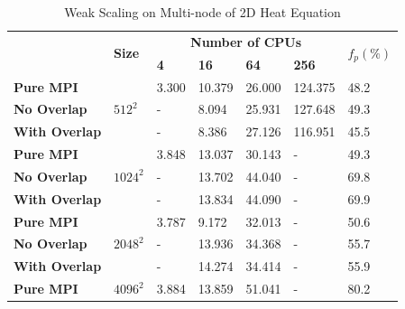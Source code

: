 \begin{table}
  \caption{Weak Scaling on Multi-node of 2D Heat Equation}
  \label{TAB:Benchmark:Weak_PURE_MPI_Multi_Node}
  \begin{minipage}{\columnwidth}
    \begin{center}
      \footnotesize %
      \begin{tabular}{>{\bfseries}p{3cm} p{1.5cm} p{1.5cm} p{1.5cm} p{1.5cm} p{1.5cm} p{1cm}}
        \toprule
        \multirow{2}{*}{Strategy}     & \multirow{2}{*}{\bfseries Size} & \multicolumn{4}{c}{\bfseries  Number of CPUs}   & \multirow{2}{*}{\bfseries $f_p(\%)$}  \\
                                      &                                 & \bfseries 4   & \bfseries 16   & \bfseries 64  & \bfseries 256  &                        \\
        \midrule
        Pure MPI      & \multirow{3}{*}{$512^2$}      & 3.300  & 10.379  & 26.000   & 124.375                                    & 48.2 \\
        No Overlap    &                               &   -    &  8.094  & 25.931   & 127.648                                    & 49.3 \\
        With Overlap  &                               &   -    &  8.386  & 27.126   & 116.951                                    & 45.5 \\
        \midrule
        Pure MPI      & \multirow{3}{*}{$1024^2$}     & 3.848  & 13.037  & 30.143   &   -                                        & 49.3 \\
        No Overlap    &                               &   -    & 13.702  & 44.040   &   -                                        & 69.8 \\
        With Overlap  &                               &   -    & 13.834  & 44.090   &   -                                        & 69.9 \\
        \midrule
        Pure MPI      & \multirow{3}{*}{$2048^2$}     & 3.787  & 9.172   & 32.013   &   -                                        & 50.6 \\
        No Overlap    &                               &   -    & 13.936  & 34.368   &   -                                        & 55.7 \\
        With Overlap  &                               &   -    & 14.274  & 34.414   &   -                                        & 55.9 \\
        \midrule
        Pure MPI      & \multirow{3}{*}{$4096^2$}     & 3.884  & 13.859  & 51.041   &   -                                        & 80.2 \\

\end{tabular}
\end{center}
\end{minipage}
\end{table}
